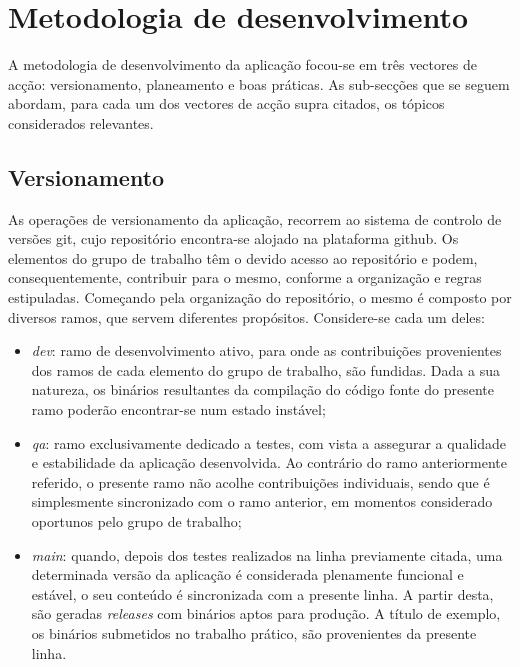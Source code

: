\documentclass[12pt]{report}
\begin{document}
\clearpage

\section{Metodologia de desenvolvimento}

A metodologia de desenvolvimento da aplicação focou-se em três vectores de acção: versionamento, planeamento e boas práticas. As sub-secções que se seguem abordam, para cada um dos vectores de acção supra citados, os tópicos considerados relevantes.

\subsection{Versionamento}

As operações de versionamento da aplicação, recorrem ao sistema de controlo de versões \gls{git}, cujo repositório encontra-se alojado na plataforma \gls{github}. Os elementos do grupo de trabalho têm o devido acesso ao repositório e podem, consequentemente, contribuir para o mesmo, conforme a organização e regras estipuladas. Começando pela organização do repositório, o mesmo é composto por diversos ramos, que servem diferentes propósitos. Considere-se cada um deles:

\begin{itemize}
    \item \emph{dev}: ramo de desenvolvimento ativo, para onde as contribuições provenientes dos ramos de cada elemento do grupo de trabalho, são fundidas. Dada a sua natureza, os binários resultantes da compilação do código fonte do presente ramo poderão encontrar-se num estado instável;
    
    \item \emph{qa}: ramo exclusivamente dedicado a testes, com vista a assegurar a qualidade e estabilidade da aplicação desenvolvida. Ao contrário do ramo anteriormente referido, o presente ramo não acolhe contribuições individuais, sendo que é simplesmente sincronizado com o ramo anterior, em momentos considerado oportunos pelo grupo de trabalho;
    
    \item \emph{main}: quando, depois dos testes realizados na linha previamente citada, uma determinada versão da aplicação é considerada plenamente funcional e estável, o seu conteúdo é sincronizada com a presente linha. A partir desta, são geradas \textit{releases} com binários aptos para produção. A título de exemplo, os binários submetidos no trabalho prático, são provenientes da presente linha.
\end{itemize}
\end{document}
